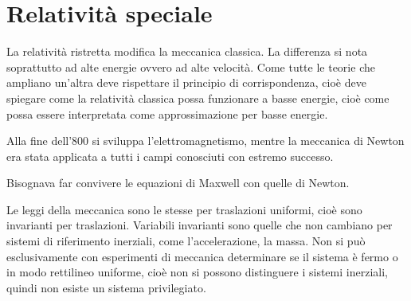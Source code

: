 \chapter{Relatività speciale}
\minitoc
La relatività ristretta modifica la meccanica classica. La differenza si nota soprattutto ad alte energie ovvero ad alte velocità. Come tutte le teorie che ampliano un'altra deve rispettare il principio di corrispondenza, cioè deve spiegare come la relatività classica possa funzionare a basse energie, cioè come possa essere interpretata come approssimazione per basse energie.

Alla fine dell'800 si sviluppa l'elettromagnetismo, mentre la meccanica di Newton era stata applicata a tutti i campi conosciuti con estremo successo.

Bisognava far convivere le equazioni di Maxwell con quelle di Newton.

Le leggi della meccanica sono le stesse per traslazioni uniformi, cioè sono invarianti per traslazioni. Variabili invarianti sono quelle che non cambiano per sistemi di riferimento inerziali, come l'accelerazione, la massa. Non si può esclusivamente con esperimenti di meccanica determinare se il sistema è fermo o in modo rettilineo uniforme, cioè non si possono distinguere i sistemi inerziali, quindi non esiste un sistema privilegiato.

